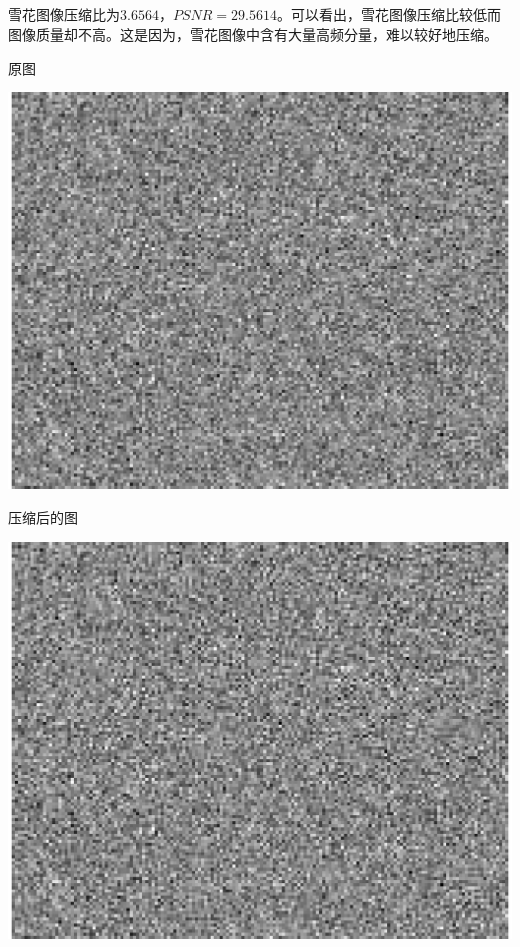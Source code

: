 \documentclass{article}
\begin{document}
\subsection{}
\noindent{}
\par 雪花图像压缩比为$3.6564$，$PSNR=29.5614$。可以看出，雪花图像压缩比较低而图像质量却不高。这是因为，雪花图像中含有大量高频分量，难以较好地压缩。
\par 原图
\begin{center}\includegraphics[width=\textwidth]{snow.eps}\end{center}
\par 压缩后的图
\begin{center}\includegraphics[width=\textwidth]{snow1.eps}\end{center}
\end{document}
